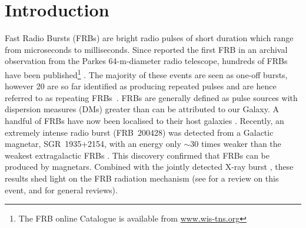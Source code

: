 \documentclass[fleqn,usenatbib]{mnras}
\newcommand\jw[1]{\textcolor{blue}{#1}}
\begin{document}
\section{Introduction}
Fast Radio Bursts (FRBs) are bright radio pulses of short duration which range from microseconds to milliseconds. Since \citet{Lorimer:2007qn} reported the first FRB in an archival observation from the Parkes 64-m-diameter radio telescope, hundreds of FRBs have been published\footnote{The FRB online Catalogue is available from \url{www.wis-tns.org}}
. The majority of these events are seen as one-off bursts, however 20 are so far identified as producing repeated pulses and are hence referred to as repeating FRBs~\citep{Spitler:2016dmz,CHIME19_2r,CHIME19_8r,Kumar19,Luo20,Geng_2021}. 
FRBs are generally defined as pulse sources with dispersion measures (DMs) greater than can be attributed to our Galaxy.
A handful of FRBs have now been localised to their host galaxies \citep[e.g.][]{Chatterjee17,Bannister19,DSA10,Prochaska19,askap_frb190711,Marcote20}. 
Recently, an extremely intense radio burst (FRB~200428) was detected from a Galactic magnetar, SGR~1935+2154, with an energy only $\sim30$ times weaker than the weakest extragalactic FRBs
\citep{frb200428,STARE2}. 
This discovery confirmed that FRBs can be produced by magnetars.
Combined with the jointly detected X-ray burst \citep{HXMT2020,INTEGRAL2020,Konus2020}, these results shed light on the FRB radiation mechanism (see \citealt{Wang2020b} for a review on this event, and \citealt{2020zhangbing,Xiao2021} for general reviews). 


\end{document}
